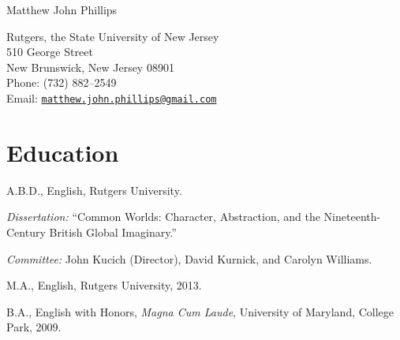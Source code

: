 \documentclass[10pt,letterpaper]{article}
\def\name{Matthew John Phillips}
\renewenvironment{itemize}{
  \begin{list}{}{
    \setlength{\leftmargin}{1.5em}
    \setlength{\itemsep}{0.25em}
    \setlength{\parskip}{0pt}
    \setlength{\parsep}{0.25em}
  }
}{
  \end{list}
}
\begin{document}
	\raggedright

{\huge \name}


\bigskip

\begin{minipage}[t]{0.495\textwidth}
  Rutgers, the State University of New Jersey \\
  510 George Street \\
  New Brunswick, New Jersey 08901 \\
    Phone: (732) 882--2549 \\
Email: \texttt{\href{mailto:matthew.john.phillips@gmail.com}{matthew.john.phillips@gmail.com}}
\end{minipage}


\section*{Education}

\begin{itemize}
  \item A.B.D., English, Rutgers University.
    \begin{itemize}
    \item \emph{Dissertation:} ``Common Worlds: Character, Abstraction, and the Nineteenth-Century British Global Imaginary.''
    \item \emph{Committee:} John Kucich (Director), David Kurnick, and Carolyn Williams.
    \end{itemize}
  \item M.A., English, Rutgers University, 2013.
  \item B.A., English with Honors, \textit{Magna Cum Laude},
    University of Maryland, College Park, 2009.
\end{itemize}


% 
\end{document}
